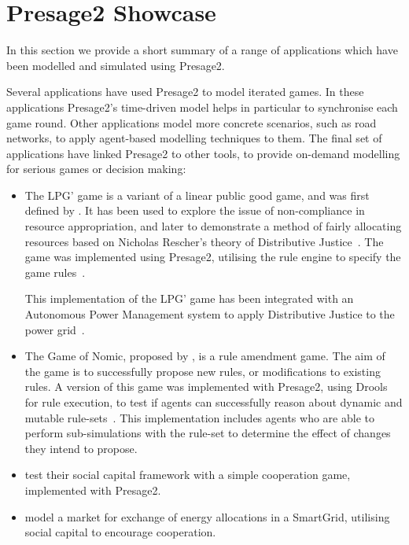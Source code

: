 \section{Presage2 Showcase}

In this section we provide a short summary of a range of applications which have
been modelled and simulated using Presage2.

Several applications have used Presage2 to model iterated games. In these
applications Presage2's time-driven model helps in particular to synchronise
each game round. Other applications model more concrete scenarios, such as
road networks, to apply agent-based modelling techniques to them. The final
set of applications have linked Presage2 to other tools, to provide on-demand
modelling for serious games or decision making:

\begin{itemize}
\item The LPG' game is a variant of a linear public good game, and was first defined
by \citet{Pitt2012c}. It has been used to explore the issue of non-compliance
in resource appropriation, and later to demonstrate a method of fairly
allocating resources based on Nicholas Rescher's theory of Distributive
Justice~\citep{Pitt2014}. The game was implemented using Presage2, utilising
the rule engine to specify the game rules~\citep{Macbeth2012}.

This implementation of the LPG' game has been integrated with an Autonomous
Power Management system to apply Distributive Justice to the power grid~\citep{Kohler2014}.

\item The Game of Nomic, proposed by \citet{Suber1990}, is a rule amendment game.
The aim of the game is to successfully propose new rules, or modifications to
existing rules. A version of this game was implemented with Presage2, using
Drools for rule execution, to test if agents can successfully reason about
dynamic and mutable rule-sets~\citep{Holland2013}. This implementation
includes agents who are able to perform sub-simulations with the rule-set to
determine the effect of changes they intend to propose.

\item \citet{Petruzzi2014} test their social capital framework with a simple
cooperation game, implemented with Presage2.

\item \citet{Petruzzi2013} model a market for exchange of energy allocations
in a SmartGrid, utilising social capital to encourage cooperation.


\end{itemize}
